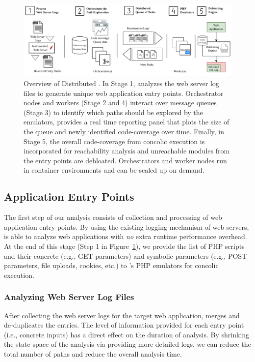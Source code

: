 \begin{figure}[t]
    \centering
    \includegraphics[width=\textwidth]{figures/ad/animatedead_diagram.pdf}
    \caption{Overview of Distributed \animatedead{}. In Stage 1, \animatedead{} analyzes the web server log files to generate unique web application entry points. Orchestrator nodes and workers (Stage 2 and 4) interact over message queues (Stage 3) to identify which paths should be explored by the emulators, \animatedead{} provides a real time reporting panel that plots the size of the queue and newly identified code-coverage over time. Finally, in Stage 5, the overall code-coverage from concolic execution is incorporated for reachability analysis and unreachable modules from the entry points are debloated. Orchestrators and worker nodes run in container environments and can be scaled up on demand.}
    \label{fig:ad_diagram}
    \vspace{-1em}
\end{figure}

\subsection{Application Entry Points}
The first step of our analysis consists of collection and processing of web application entry points.  
By using the existing logging mechanism of web servers, \animatedead{} is able to analyze web applications with \emph{no} extra runtime performance overhead. 
At the end of this stage (Step 1 in Figure~\ref{fig:ad_diagram}), we provide the list of PHP scripts and their concrete (e.g., GET parameters) and symbolic parameters (e.g., POST parameters, file uploads, cookies, etc.) to \animatedead{}'s PHP emulators for concolic execution. 

\subsubsection*{Analyzing Web Server Log Files} 
After collecting the web server logs for the target web application, \animatedead{} merges and de-duplicates the entries. 
The level of information provided for each entry point (i.e., concrete inputs) has a direct effect on the duration of analysis. 
By shrinking the state space of the analysis via providing more detailed logs, we can reduce the total number of paths and reduce the overall analysis time. 

